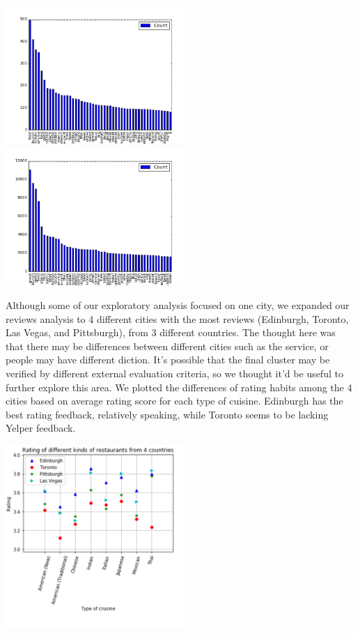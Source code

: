 \documentclass{neu_handout}
\begin{document}
\begin{center}
\includegraphics[width=70mm,scale=0.5]{top50_negativereviews}
\includegraphics[width=70mm,scale=0.5]{top50_positivereviews}
\end{center}

Although some of our exploratory analysis focused on one city, we expanded our reviews analysis to 4 different cities with the most reviews (Edinburgh, Toronto, Las Vegas, and Pittsburgh), from 3 different countries. The thought here was that there may be differences between different cities such as the service, or people may have different diction. It's possible that the final cluster may be verified by different external evaluation criteria, so we thought it'd be useful to further explore this area. We plotted the differences of rating habits among the 4 cities based on average rating score for each type of cuisine. Edinburgh has the best rating feedback, relatively speaking, while Toronto seems to be lacking Yelper feedback.\\

\begin{center}
	\includegraphics[width=70mm,scale=0.5]{Rating_different_restaurants_countries.png}
\end{center}
\end{document}
